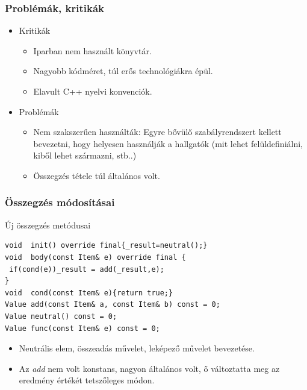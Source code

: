 \documentclass[11pt]{beamer}
\begin{document}
\begin{frame}
	\frametitle{Problémák, kritikák}
	\begin{itemize}
		\item Kritikák
		\begin{itemize}
			\item Iparban nem használt könyvtár.
			\item Nagyobb kódméret, túl erős technológiákra épül.
			\item Elavult C++ nyelvi konvenciók.
		\end{itemize}
		\item Problémák
		\begin{itemize}
			\item Nem szakszerűen használták: Egyre bővülő szabályrendszert kellett  bevezetni, hogy helyesen használják a hallgatók (mit lehet felüldefiniálni, kiből lehet származni, stb..)
			\item Összegzés tétele túl általános volt.
		\end{itemize}
	\end{itemize}
\end{frame}

\begin{frame}[fragile]
	\frametitle{Összegzés módosításai}
	\begin{block}{Új összegzés metódusai}
	\begin{lstlisting}[basicstyle=\small]
void  init() override final{_result=neutral();}
void  body(const Item& e) override final {
 if(cond(e))_result = add(_result,e);
}
void  cond(const Item& e){return true;}
Value add(const Item& a, const Item& b) const = 0;
Value neutral() const = 0;
Value func(const Item& e) const = 0;

	\end{lstlisting}
	\end{block}
	
	\begin{itemize}
	\item Neutrális elem, összeadás művelet, leképező művelet bevezetése.
	\item Az \textit{add} nem volt konstans, nagyon általános volt, ő változtatta meg az eredmény értékét tetszőleges módon.
	\end{itemize}
\end{frame}
\end{document}
